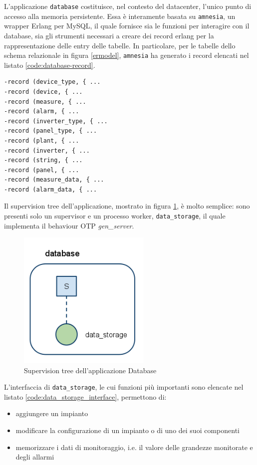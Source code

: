 %
L'applicazione \texttt{database} costituisce, nel contesto del datacenter, 
l'unico punto di accesso alla memoria persistente.
%
Essa \`e interamente basata su \texttt{amnesia}\cite{erl-amnesia}, un wrapper Erlang 
per MySQL, il quale fornisce sia le funzioni per interagire con il database, 
sia gli strumenti necessari a creare dei record erlang per la rappresentazione 
delle entry delle tabelle.
%
In particolare, per le tabelle dello schema relazionale in figura \ref{ermodel}, 
\texttt{amnesia} ha generato i record elencati nel listato \ref{code:database-record}.
%
\begin{lstlisting}[caption={Record per interfacciamento con il database}, label={code:database-record},frame=trBL]
-record (device_type, { ...
-record (device, { ...
-record (measure, { ...
-record (alarm, { ...
-record (inverter_type, { ...
-record (panel_type, { ...
-record (plant, { ...
-record (inverter, { ...
-record (string, { ...
-record (panel, { ...
-record (measure_data, { ...
-record (alarm_data, { ...
\end{lstlisting}
%
Il supervision tree dell'applicazione, mostrato in figura \ref{database-suptree}, \`e molto 
semplice: sono presenti solo  un supervisor e  un processo worker, 
\texttt{data\_storage}, il quale implementa il behaviour OTP \emph{gen\_server}\cite{gen-server}.
%

%
\begin{figure}[!h]
\centering
\includegraphics[width=180pt]{img/database.png}
\caption{Supervision tree dell'applicazione Database}
\label{database-suptree}
\end{figure}
%

%
L'interfaccia di \texttt{data\_storage}, le cui funzioni pi\`u importanti sono 
elencate nel listato \ref{code:data_storage_interface}, permettono di:
%
\begin{itemize}
\item aggiungere un impianto
\item modificare la configurazione di un impianto o di uno dei suoi componenti
\item memorizzare i dati di monitoraggio, i.e. il valore delle grandezze monitorate e degli allarmi
\end{itemize}
%

